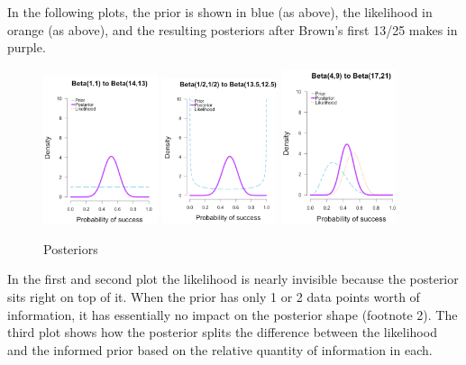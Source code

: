 In the following plots, the prior is shown in blue (as above), the likelihood in orange (as above), and the resulting posteriors after Brown's first 13/25 makes in purple.


\begin{figure}[h]
    \centering
\includegraphics[width=0.3\textwidth]{pic/p05c03-snip07-1.png}
\includegraphics[width=0.3\textwidth]{pic/p05c03-snip07-2.png}
\includegraphics[width=0.3\textwidth]{pic/p05c03-snip07-3.png}
    \caption{Posteriors}
    \label{fig:p05c03-snip07}
\end{figure}


In the first and second plot the likelihood is nearly invisible because the posterior sits right on top of it. When the prior has only 1 or 2 data points worth of information, it has essentially no impact on the posterior shape (footnote 2). The third plot shows how the posterior splits the difference between the likelihood and the informed prior based on the relative quantity of information in each.

